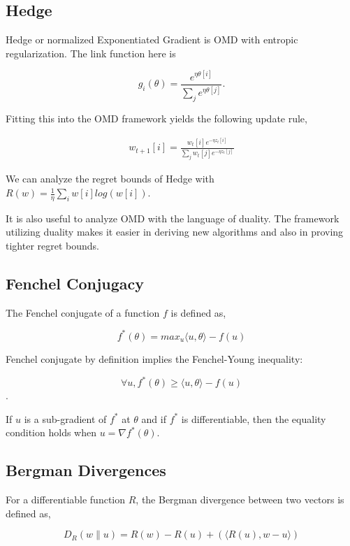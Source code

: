\subsection{Hedge}


Hedge or normalized Exponentiated Gradient is OMD with entropic regularization. The link function here is

\begin{equation}
    g_i(\theta) = \frac{e^{\eta \theta[i]}}{\sum_j e^{\eta \theta[j]}}.
\end{equation}

Fitting this into the OMD framework yields the following update rule,

\begin{align*}
    w_{t+1}[i] = \frac{w_t[i] e^{-\eta z_t[i]}}{\sum_j w_t[j] e^{-\eta z_t[j]}}
\end{align*}

We can analyze the regret bounds of Hedge with $R(w) = \frac{1}{\eta} \sum_i w[i] log(w[i])$. 


It is also useful to analyze OMD with the language of duality. The framework utilizing duality makes it easier 
in deriving new algorithms and also in proving tighter regret bounds.

\subsection{Fenchel Conjugacy}

The Fenchel conjugate of a function $f$ is defined as,

$$f^*(\theta) = max_u \langle u, \theta \rangle - f(u)$$

Fenchel conjugate by definition implies the Fenchel-Young inequality:

$$\forall u, f^*(\theta) \geq \langle u, \theta \rangle - f(u)$$.

If $u$ is a sub-gradient of $f^*$ at $\theta$ and if $f^*$ is differentiable, then the equality 
condition holds when $u = \nabla f^*(\theta)$. 


\subsection{Bergman Divergences}

For a differentiable function $R$, the Bergman divergence between two vectors is defined as,

\begin{equation}
    D_R(w \| u) = R(w) - R(u) + (\langle R(u), w-u \rangle)
\end{equation}


